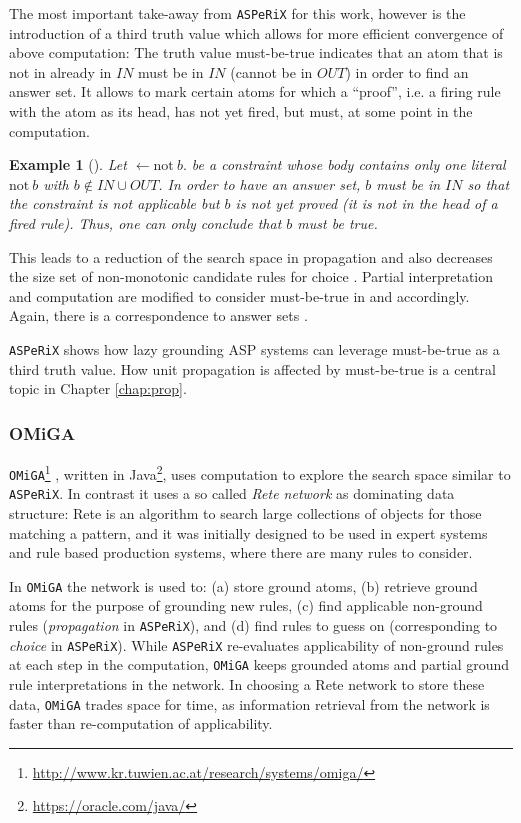 \documentclass{vutinfth} %
\newtheorem{example}{Example}[section]
\newcommand{\mbt}{must-be-true\xspace}
\newcommand{\fail}{\mathrm{not } \ \xspace}
\newcommand{\from}{\ensuremath{\leftarrow}}
\newcommand{\asperix}{\texttt{ASPeRiX}\xspace}
\newcommand{\omiga}{\texttt{OMiGA}\xspace}
\begin{document}
The most important take-away from \asperix for this work, however is the introduction of a third truth value which allows for more efficient convergence of above computation: The truth value \mbt indicates that an atom that is not in already in $IN$ must be in $IN$ (cannot be in $OUT$) in order to find an answer set. It allows to mark certain atoms for which a \enquote{proof}, i.e. a firing rule with the atom as its head, has not yet fired, but must, at some point in the computation.

\begin{example}[{\cite[Example 7]{asperix}}]
\label{ex:mbt}
Let $\from \fail b.$ be a constraint whose body contains only one literal $\fail b$ with $b \not \in IN \cup OUT$. In order to have an answer set, $b$ must be in $IN$ so that the constraint is not applicable but $b$ is not yet proved (it is not in the head of a fired rule). Thus, one can only conclude that $b$ must be true.
\end{example}

This leads to a reduction of the search space in propagation \cite[Ex.~8]{asperix} and also decreases the size set of non-monotonic candidate rules for choice \cite[Ex.~9]{asperix}. Partial interpretation and computation are modified to consider \mbt in \cite[Def.~8]{asperix} and \cite[Def.~11]{asperix} accordingly. Again, there is a correspondence to answer sets \cite[Thm.~3]{asperix}.

\asperix shows how lazy grounding ASP systems can leverage \mbt as a third truth value. How unit propagation is affected by \mbt is a central topic in Chapter \ref{chap:prop}.

\subsubsection{OMiGA}

\omiga\footnote{\url{http://www.kr.tuwien.ac.at/research/systems/omiga/}} \cite{omiga}, written in Java\footnote{\url{https://oracle.com/java/}}, uses computation to explore the search space similar to \asperix. In contrast it uses a so called \emph{Rete network} \cite{rete} as dominating data structure: Rete is an algorithm to search large collections of objects for those matching a pattern, and it was initially designed to be used in expert systems and rule based production systems, where there are many rules to consider.

In \omiga the network is used to: (a) store ground atoms, (b) retrieve ground atoms for the purpose of grounding new rules, (c) find applicable non-ground rules (\emph{propagation} in \asperix), and (d) find rules to guess on (corresponding to \emph{choice} in \asperix). While \asperix re-evaluates applicability of non-ground rules at each step in the computation, \omiga keeps grounded atoms and partial ground rule interpretations in the network. In choosing a Rete network to store these data, \omiga trades space for time, as information retrieval from the network is faster than re-computation of applicability. 
\end{document}
